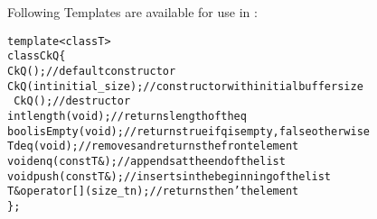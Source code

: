 



Following Templates are available for use in \CC{}:

\begin{alltt}
template<class T>
class CkQ \{
  CkQ();  // default constructor
  CkQ(int initial_size); // constructor with initial buffer size
  ~CkQ(); // destructor
  int length(void); // returns length of the q
  bool isEmpty(void); // returns true if q is empty, false otherwise
  T deq(void); // removes and returns the front element
  void enq(const T\&); // appends at the end of the list
  void push(const T\&); // inserts in the beginning of the list
  T\& operator[](size_t n); // returns the n'th element
\};
\end{alltt}

